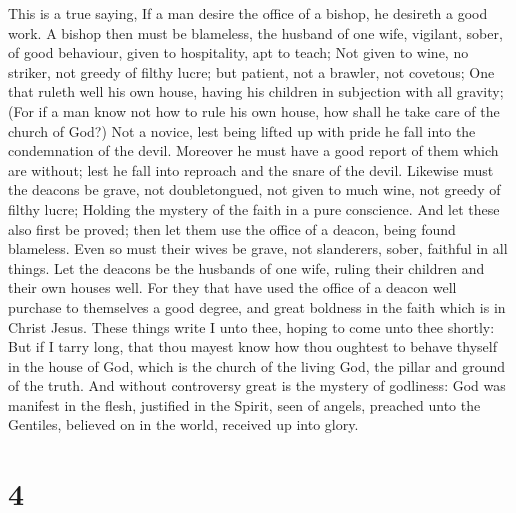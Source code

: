  This is a true saying, If a man desire the office of a
bishop, he desireth a good work.  A bishop then must be
blameless, the husband of one wife, vigilant, sober, of good behaviour,
given to hospitality, apt to teach;  Not given to wine, no
striker, not greedy of filthy lucre; but patient, not a brawler, not
covetous;  One that ruleth well his own house, having his
children in subjection with all gravity;  (For if a man know
not how to rule his own house, how shall he take care of the church of
God?)  Not a novice, lest being lifted up with pride he fall
into the condemnation of the devil.  Moreover he must have a
good report of them which are without; lest he fall into reproach and
the snare of the devil.  Likewise must the deacons be grave,
not doubletongued, not given to much wine, not greedy of filthy lucre;
 Holding the mystery of the faith in a pure conscience.
 And let these also first be proved; then let them use the
office of a deacon, being found blameless.  Even so must
their wives be grave, not slanderers, sober, faithful in all things.
 Let the deacons be the husbands of one wife, ruling their
children and their own houses well.  For they that have
used the office of a deacon well purchase to themselves a good degree,
and great boldness in the faith which is in Christ Jesus. 
These things write I unto thee, hoping to come unto thee shortly:
 But if I tarry long, that thou mayest know how thou
oughtest to behave thyself in the house of God, which is the church of
the living God, the pillar and ground of the truth.  And
without controversy great is the mystery of godliness: God was manifest
in the flesh, justified in the Spirit, seen of angels, preached unto the
Gentiles, believed on in the world, received up into glory.

\hypertarget{section-3}{%
\section{4}\label{section-3}}

